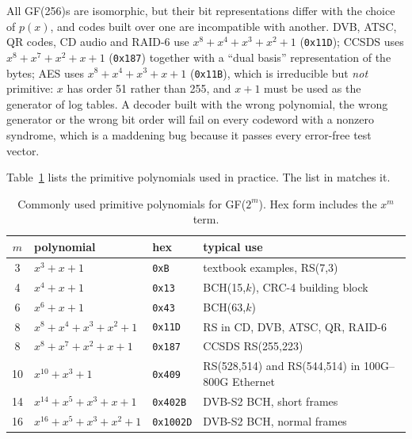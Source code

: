 
\begin{pitfall}
All GF(256)s are isomorphic, but their bit representations differ with the choice of $p(x)$, and
codes built over one are incompatible with another. DVB, ATSC, QR codes, CD audio and RAID-6 use
$x^8+x^4+x^3+x^2+1$ (\texttt{0x11D}); CCSDS uses $x^8+x^7+x^2+x+1$ (\texttt{0x187}) together with a
``dual basis'' representation of the bytes; AES uses $x^8+x^4+x^3+x+1$ (\texttt{0x11B}), which is
irreducible but \emph{not} primitive: $x$ has order 51 rather than 255, and $x+1$ must be used as the
generator of log tables. A decoder built with the wrong polynomial, the wrong generator or the
wrong bit order will fail on every codeword with a nonzero syndrome, which is a maddening bug
because it passes every error-free test vector.
\end{pitfall}

Table~\ref{tab:ch14:prim} lists the primitive polynomials used in practice. The list in
 matches it.

\begin{table}[htbp]\centering\small
\caption{Commonly used primitive polynomials for GF($2^m$). Hex form includes the $x^m$ term.}
\label{tab:ch14:prim}
\begin{tabularx}{\linewidth}{@{}c l l X@{}}
\toprule
$m$ & polynomial & hex & typical use\\
\midrule
3 & $x^3+x+1$ & \texttt{0xB} & textbook examples, RS(7,3)\\
4 & $x^4+x+1$ & \texttt{0x13} & BCH(15,$k$), CRC-4 building block\\
6 & $x^6+x+1$ & \texttt{0x43} & BCH(63,$k$)\\
8 & $x^8+x^4+x^3+x^2+1$ & \texttt{0x11D} & RS in CD, DVB, ATSC, QR, RAID-6\\
8 & $x^8+x^7+x^2+x+1$ & \texttt{0x187} & CCSDS RS(255,223)\\
10 & $x^{10}+x^3+1$ & \texttt{0x409} & RS(528,514) and RS(544,514) in 100G--800G Ethernet\\
14 & $x^{14}+x^5+x^3+x+1$ & \texttt{0x402B} & DVB-S2 BCH, short frames\\
16 & $x^{16}+x^5+x^3+x^2+1$ & \texttt{0x1002D} & DVB-S2 BCH, normal frames\\
\bottomrule
\end{tabularx}
\end{table}

